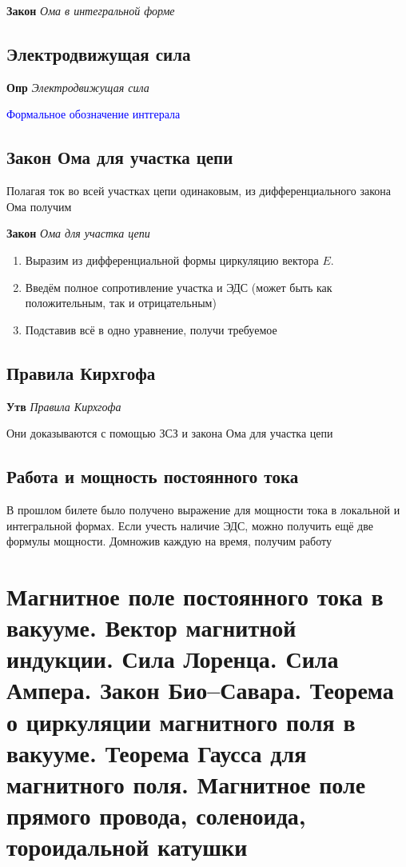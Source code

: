\documentclass[a4paper, 14pt]{article}
\begin{document}
    \textbf{Закон} \textit{Ома в интегральной форме}
    
    \subsection{Электродвижущая сила}
    
    \textbf{Опр} \textit{Электродвижущая сила}
    
    \textcolor{blue}{Формальное обозначение интгерала}
    
    \subsection{Закон Ома для участка цепи}
    
    Полагая ток во всей участках цепи одинаковым, из дифференциального закона Ома получим
    
    \textbf{Закон} \textit{Ома для участка цепи}
    
    \begin{enumerate}
        \item Выразим из дифференциальной формы циркуляцию вектора $E$.
        \item Введём полное сопротивление участка и ЭДС (может быть как положительным, так и отрицательным)
        \item Подставив всё в одно уравнение, получи требуемое
    \end{enumerate}
    
    \subsection{Правила Кирхгофа}
    
    \textbf{Утв} \textit{Правила Кирхгофа}
    
    Они доказываются с помощью ЗСЗ и закона Ома для участка цепи
    
    \subsection{Работа и мощность постоянного тока}
    
    В прошлом билете было получено выражение для мощности тока в локальной и интегральной формах.
    Если учесть наличие ЭДС, можно получить ещё две формулы мощности.
    Домножив каждую на время, получим работу
    
    \section{Магнитное поле постоянного тока в вакууме.
    Вектор магнитной индукции.
    Сила Лоренца.
    Сила Ампера.
    Закон Био–Савара.
    Теорема о циркуляции магнитного поля в вакууме.
    Теорема Гаусса для магнитного поля.
    Магнитное поле прямого провода, соленоида, тороидальной катушки}
    
\end{document}
